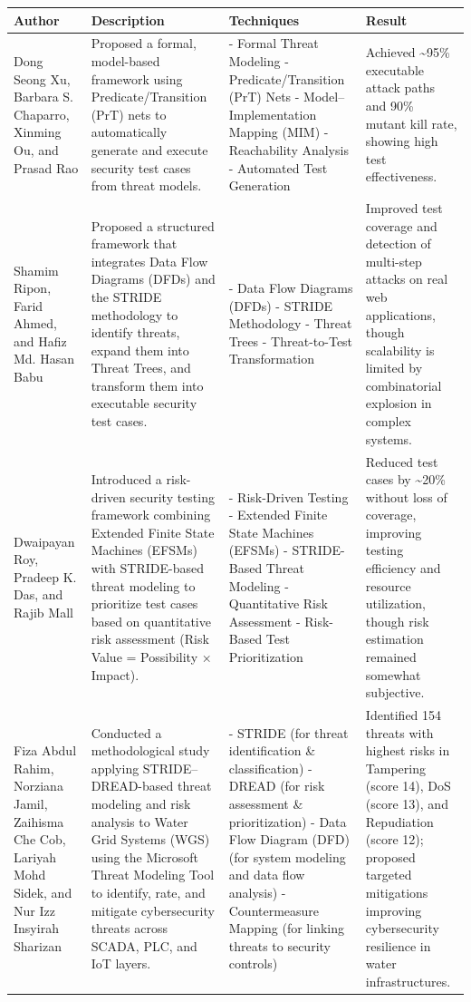 \documentclass[12pt,a4paper]{report}
\begin{document}
\begin{table}[H]
\centering
\small
\begin{tabularx}{\textwidth}{|l|l|l|l|}
\hline
Author & Description & Techniques & Result \\
\hline\hline
[1] Dong Seong Xu, Barbara S. Chaparro, Xinming Ou, and Prasad Rao & Proposed a formal, model-based framework using Predicate/Transition (PrT) nets to automatically generate and execute security test cases from threat models. & - Formal Threat Modeling
- Predicate/Transition (PrT) Nets
- Model–Implementation Mapping (MIM)
- Reachability Analysis
- Automated Test Generation & Achieved \textasciitilde{}95\% executable attack paths and 90\% mutant kill rate, showing high test effectiveness. \\
\hline
[2] Shamim Ripon, Farid Ahmed, and Hafiz Md. Hasan Babu & Proposed a structured framework that integrates Data Flow Diagrams (DFDs) and the STRIDE methodology to identify threats, expand them into Threat Trees, and transform them into executable security test cases. & - Data Flow Diagrams (DFDs)
- STRIDE Methodology
- Threat Trees
- Threat-to-Test Transformation & Improved test coverage and detection of multi-step attacks on real web applications, though scalability is limited by combinatorial explosion in complex systems. \\
\hline
[3] Dwaipayan Roy, Pradeep K. Das, and Rajib Mall & Introduced a risk-driven security testing framework combining Extended Finite State Machines (EFSMs) with STRIDE-based threat modeling to prioritize test cases based on quantitative risk assessment (Risk Value = Possibility × Impact). & - Risk-Driven Testing
- Extended Finite State Machines (EFSMs)
- STRIDE-Based Threat Modeling
- Quantitative Risk Assessment
- Risk-Based Test Prioritization & Reduced test cases by \textasciitilde{}20\% without loss of coverage, improving testing efficiency and resource utilization, though risk estimation remained somewhat subjective. \\
\hline
[4] Fiza Abdul Rahim, Norziana Jamil, Zaihisma Che Cob, Lariyah Mohd Sidek, and Nur Izz Insyirah Sharizan & Conducted a methodological study applying STRIDE–DREAD-based threat modeling and risk analysis to Water Grid Systems (WGS) using the Microsoft Threat Modeling Tool to identify, rate, and mitigate cybersecurity threats across SCADA, PLC, and IoT layers. & - STRIDE (for threat identification \& classification)
- DREAD (for risk assessment \& prioritization)
- Data Flow Diagram (DFD) (for system modeling and data flow analysis)
- Countermeasure Mapping (for linking threats to security controls) & Identified 154 threats with highest risks in Tampering (score 14), DoS (score 13), and Repudiation (score 12); proposed targeted mitigations improving cybersecurity resilience in water infrastructures. \\

\end{tabularx}
\end{table}
\end{document}
